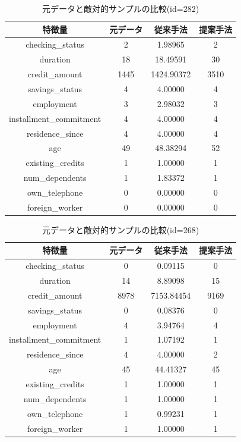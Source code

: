 \begin{table}[H]
    \centering
    \caption{元データと敵対的サンプルの比較(id=282)}
    \begin{tabular}{|c|c|c|c|} \hline
        特徴量 & 元データ & 従来手法 & 提案手法 \\ \hline
        checking\_status & 2 & 1.98965 & 2 \\ \hline
        duration & 18 & 18.49591 & 30 \\ \hline
        credit\_amount & 1445 & 1424.90372 & 3510 \\ \hline
        savings\_status & 4 & 4.00000 & 4 \\ \hline
        employment & 3 & 2.98032 & 3 \\ \hline
        installment\_commitment & 4 & 4.00000 & 4 \\ \hline
        residence\_since & 4 & 4.00000 & 4 \\ \hline
        age & 49 & 48.38294 & 52 \\ \hline
        existing\_credits & 1 & 1.00000 & 1 \\ \hline
        num\_dependents & 1 & 1.83372 & 1 \\ \hline
        own\_telephone & 0 & 0.00000 & 0 \\ \hline
        foreign\_worker & 0 & 0.00000 & 0 \\ \hline
    \end{tabular}
\end{table}


\begin{table}[H]
    \centering
    \caption{元データと敵対的サンプルの比較(id=268)}
    \begin{tabular}{|c|c|c|c|} \hline
        特徴量 & 元データ & 従来手法 & 提案手法 \\ \hline
        checking\_status & 0 & 0.09115 & 0 \\ \hline
        duration & 14 & 8.89098 & 15 \\ \hline
        credit\_amount & 8978 & 7153.84454 & 9169 \\ \hline
        savings\_status & 0 & 0.08376 & 0 \\ \hline
        employment & 4 & 3.94764 & 4 \\ \hline
        installment\_commitment & 1 & 1.07192 & 1 \\ \hline
        residence\_since & 4 & 4.00000 & 2 \\ \hline
        age & 45 & 44.41327 & 45 \\ \hline
        existing\_credits & 1 & 1.00000 & 1 \\ \hline
        num\_dependents & 1 & 1.00000 & 1 \\ \hline
        own\_telephone & 1 & 0.99231 & 1 \\ \hline
        foreign\_worker & 1 & 1.00000 & 1 \\ \hline
    \end{tabular}
\end{table}

